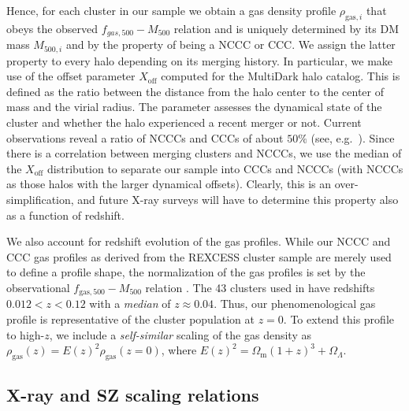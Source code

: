 \documentclass[traditabstract]{aa}
\newcommand{\rmn}{\mathrm}
\begin{document}
Hence, for each cluster in our sample we obtain a gas density profile
$\rho_{\rmn{gas},i}$ that obeys the observed $f_{gas,500}-M_{500}$ relation and
is uniquely determined by its DM mass $M_{500,i}$ and by the property of being a
NCCC or CCC. We assign the latter property to every halo depending on its
merging history. In particular, we make use of the offset parameter
$X_{\rmn{off}}$ computed for the MultiDark halo catalog. This is defined as the
ratio between the distance from the halo center to the center of mass and the
virial radius. The parameter assesses the dynamical state of the cluster and
whether the halo experienced a recent merger or not. Current observations reveal
a ratio of NCCCs and CCCs of about $50\%$ (see, e.g.~\citealp{2007A&A...466..805C,
  2009MNRAS.395..764S}). Since there is a correlation between merging clusters
and NCCCs, we use the median of the $X_{\rmn{off}}$ distribution to separate our
sample into CCCs and NCCCs (with NCCCs as those halos with the larger dynamical
offsets). Clearly, this is an over-simplification, and future X-ray surveys will
have to determine this property also as a function of redshift.

We also account for redshift evolution of the gas profiles. While our NCCC and
CCC gas profiles as derived from the REXCESS cluster sample are merely used to
define a profile shape, the normalization of the gas profiles is set by the
observational $f_{\rmn{gas},500}-M_{500}$ relation \citep{2009ApJ...693.1142S}.
The 43 clusters used in \cite{2009ApJ...693.1142S} have redshifts $0.012 < z <
0.12$ with a \emph{median} of $z \approx 0.04$. Thus, our phenomenological gas
profile is representative of the cluster population at $z=0$. To extend this
profile to high-$z$, we include a \emph{self-similar} scaling of the gas density
as $\rho_{\rmn{gas}}(z) = E(z)^{2} \rho_{\rmn{gas}}(z=0)$, where $E(z)^{2} =
\Omega_{\rmn{m}} (1+z)^{3} + \Omega_{{\Lambda}}$.


\subsection{X-ray and SZ scaling relations}
\end{document}
